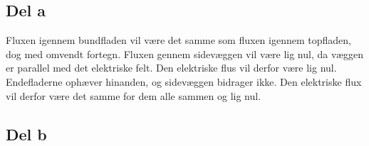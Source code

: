 \subsection{Del a} %
\label{sub:del_a}
Fluxen igennem bundfladen vil være det samme som fluxen igennem topfladen, dog med omvendt fortegn. Fluxen gennem sidevæggen vil være lig nul, da væggen er parallel med det elektriske felt. Den elektriske flus vil derfor være lig nul. Endefladerne ophæver hinanden, og sidevæggen  bidrager ikke. Den elektriske flux vil derfor være det samme for dem alle sammen og lig nul.

\subsection{Del b} %
\label{sub:del_b}

